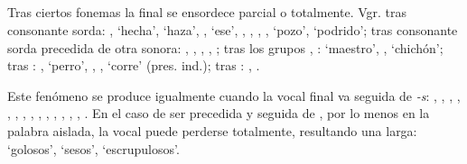 \subsection{} Tras ciertos fonemas la final se ensordece parcial o totalmente.
Vgr. tras consonante sorda: ,
 `hecha',
 `haza',
,
 `ese',
,
,
,
,
 `pozo',
 `podrido'; tras consonante sorda
precedida de otra sonora: ,
,
,
,
; tras los grupos
, :
 `maestro',
,
 `chichón'; tras
\textipa{[-r-]}: ,
 `perro',
,
,
 `corre' (pres. ind.);
tras \textipa{[-n-]}:
,
.

Este fenómeno se produce igualmente cuando la vocal final va seguida de
\emph{-s}: ,
,
,
,
,
,
,
,
,
,
,
,
,
,
. En el caso de ser precedida y seguida de
\textipa{[-s-]}, por lo menos en la palabra aislada, la vocal puede perderse
totalmente, resultando una \textipa{[s:]} larga:
 `golosos',
 `sesos',
 `escrupulosos'.
